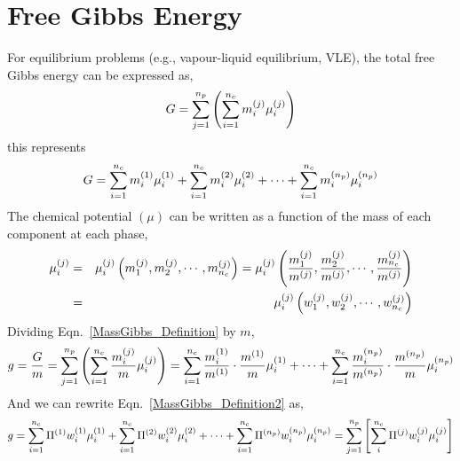 \section{Free Gibbs Energy}\label{Chapter:ThermodynamicFormulation:Section:GibbsEnergy}
For equilibrium problems (e.g., vapour-liquid equilibrium, VLE), the total free Gibbs energy can be expressed as,
\begin{equation}
G = \summation_{j=1}^{n_{p}}\left(\summation_{i=1}^{n_{c}} \mfr[m]{i}{j}\mfr[\mu]{i}{j}\right)
\label{MassGibbs_Definition}
\end{equation} 
this represents
\begin{displaymath}
G = \summation_{i=1}^{n_{c}} \mfr[m]{i}{1}\mfr[\mu]{i}{1} + \summation_{i=1}^{n_{c}} \mfr[m]{i}{2}\mfr[\mu]{i}{2} + \cdots + \summation_{i=1}^{n_{c}} \mfr[m]{i}{n_{p}}\mfr[\mu]{i}{n_{p}}
\end{displaymath}
The chemical potential $\left(\mu\right)$ can be written as a function of the mass of each component at each phase,
\begin{eqnarray}
\mfr[\mu]{i}{j} &=& \mfr[\mu]{i}{j}\left(\mfr[m]{1}{j}, \mfr[m]{2}{j}, \cdots, \mfr[m]{n_{c}}{j}\right) = \mfr[\mu]{i}{j}\left(\frc{\mfr[m]{1}{j}}{\mfr[m]{}{j}}, \frc{\mfr[m]{2}{j}}{\mfr[m]{}{j}}, \cdots, \frc{\mfr[m]{n_{c}}{j}}{\mfr[m]{}{j}}\right)\nonumber \\
&=& \mfr[\mu]{i}{j}\left(\mfr[w]{1}{j}, \mfr[w]{2}{j}, \cdots, \mfr[w]{n_{c}}{j}\right)\label{chempotential_functional}
\end{eqnarray}
Dividing Eqn.~\ref{MassGibbs_Definition} by $m$,
\begin{equation}
g = \frc{G}{m} = \summation_{j=1}^{n_{p}}\left(\summation_{i=1}^{n_{c}}\frc{\mfr[m]{i}{j}}{m}\mfr[\mu]{i}{j}\right) = \summation_{i=1}^{n_{c}}\frc{\mfr[m]{i}{1}}{m^{(1)}} \cdot \frc{m^{(1)}}{m} \mfr[\mu]{i}{1} + \cdots + \summation_{i=1}^{n_{c}}\frc{\mfr[m]{i}{n_{p}}}{\mfr[m]{}{n_{p}}} \cdot \frc{\mfr[m]{}{n_{p}}}{m} \mfr[\mu]{i}{n_{p}}
\label{MassGibbs_Definition2}
\end{equation}
And we can rewrite Eqn.~\ref{MassGibbs_Definition2} as,
\begin{equation}
g = \summation_{i=1}^{n_{c}}\Pi^{(1)}\mfr[w]{i}{1}\mfr[\mu]{i}{1} + \summation_{i=1}^{n_{c}}\Pi^{(2)}\mfr[w]{i}{2}\mfr[\mu]{i}{2} + \cdots + \summation_{i=1}^{n_{c}}\mfr[\Pi]{}{n_{p}}\mfr[w]{i}{n_{p}}\mfr[\mu]{i}{n_{p}} = \summation_{j=1}^{n_{p}}\left[\summation_{i}^{n_{c}}\mfr[\Pi]{}{j}\mfr[w]{i}{j}\mfr[\mu]{i}{j}\right] \label{MassGibbs_Definition3}
\end{equation}



